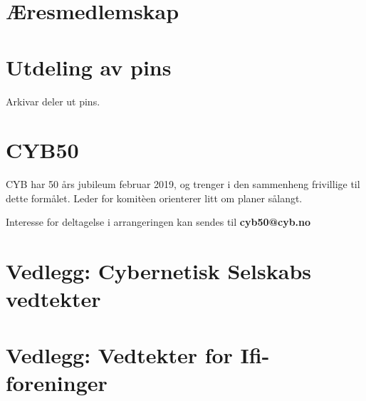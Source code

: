 \documentclass[10pt,norsk,a4paper]{article}
\begin{document}
\section{Æresmedlemskap}

\section{Utdeling av pins}

Arkivar deler ut pins.

\section{CYB50}

CYB har 50 års jubileum februar 2019, og trenger i den sammenheng frivillige til dette formålet. Leder for komitèen orienterer litt om planer sålangt.

Interesse for deltagelse i arrangeringen kan sendes til \textbf{cyb50@cyb.no}

\section*{Vedlegg: Cybernetisk Selskabs vedtekter}
\section*{Vedlegg: Vedtekter for Ifi-foreninger}\label{lastpage}


\newpage



\end{document}
